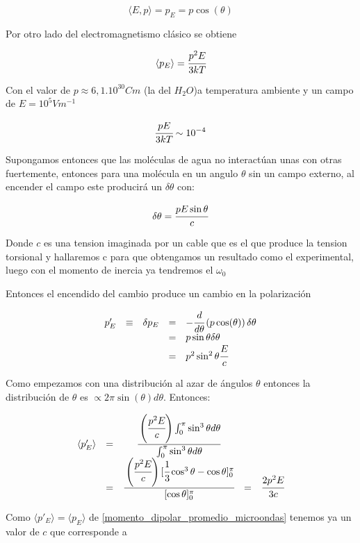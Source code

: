 \documentclass[a4paper,spanish]{article}
\numberwithin{equation}{section}
\begin{document}
\[\langle{E,p}\rangle=p_E=p\cos(\theta)\]

Por otro lado del electromagnetismo cl\'asico se obtiene

\begin{equation}
\langle{p_E}\rangle=\cfrac{p^2 E}{3kT}
\label{momento_dipolar_promedio_microondas}
\end{equation}

Con el valor de $p\approx 6,1.10^{30} C m$ (la del $H_2O$)a temperatura ambiente y un campo de $E=10^5 V m^{-1}$

\[\cfrac{p E}{3kT}\sim 10^{-4}\]

Supongamos entonces que las mol\'eculas de agua no interact\'uan unas con otras fuertemente, entonces para una mol\'ecula en un angulo $\theta$ sin un campo externo, al encender el campo este producir\'a un $\delta\theta$ con:

\[\delta\theta=\cfrac{pE\sin{\theta}}{c}\]

Donde $c$ es una tension imaginada por un cable que es el que produce la tension torsional y hallaremos c para que obtengamos un resultado como el experimental, luego con el momento de inercia ya tendremos el $\omega_0$

Entonces el encendido del cambio produce un cambio en la polarizaci\'on

\[
\begin{array}{rcccl}
p'_E & \equiv & \delta p_E & = & -\cfrac{d}{d\theta}\left(p\cos(\theta)\right)\delta\theta \\
& & & = & p \sin {\theta} \delta\theta \\
& & & = & p^2 \sin^2 {\theta} \cfrac{E}{c}
\end{array}
\]

Como empezamos con una distribuci\'on al azar de \'angulos $\theta$ entonces la distribuci\'on de $\theta$ es $\propto 2\pi \sin(\theta)d\theta$. Entonces:

\[
\begin{array}{rcccl}
\langle{p'_E}\rangle & = & \cfrac{\left(\cfrac{p^2 E}{c}\right)\int_{0}^{\pi}\sin^3{\theta} d\theta}{\int_{0}^{\pi}\sin^3{\theta} d\theta} & & \\
& = & \cfrac{\left(\cfrac{p^2 E}{c}\right)[\cfrac{1}{3}\cos^3{\theta}- \cos{\theta}]_{0}^{\pi}}{[\cos{\theta}]_{0}^{\pi}} & = & \cfrac{2 p^2 E}{3c}
\end{array}
\]

Como $\langle{p'_E}\rangle = \langle{p_E}\rangle$ de \ref{momento_dipolar_promedio_microondas} tenemos ya un valor de $c$ que corresponde a 
\end{document}
